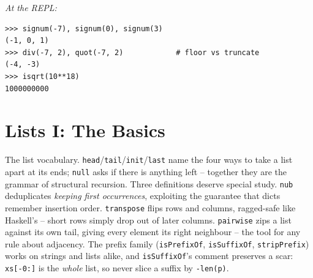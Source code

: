 \documentclass[11pt,letterpaper]{book}
\begin{document}
\noindent\textit{At the REPL:}
\begin{lstlisting}[style=spec]
>>> signum(-7), signum(0), signum(3)
(-1, 0, 1)
>>> div(-7, 2), quot(-7, 2)            # floor vs truncate
(-4, -3)
>>> isqrt(10**18)
1000000000
\end{lstlisting}
\chapter{Lists I: The Basics}

The list vocabulary. \texttt{head}/\texttt{tail}/\texttt{init}/\texttt{last}
name the four ways to take a list apart at its ends; \texttt{null} asks if
there is anything left -- together they are the grammar of structural
recursion. Three definitions deserve special study. \texttt{nub} deduplicates
\emph{keeping first occurrences}, exploiting the guarantee that dicts remember
insertion order. \texttt{transpose} flips rows and columns, ragged-safe like
Haskell's -- short rows simply drop out of later columns. \texttt{pairwise}
zips a list against its own tail, giving every element
its right neighbour -- the tool for any rule about adjacency. The prefix family
(\texttt{isPrefixOf}, \texttt{isSuffixOf}, \texttt{stripPrefix}) works on
strings and lists alike, and \texttt{isSuffixOf}'s comment preserves a scar:
\texttt{xs[-0:]} is the \emph{whole} list, so never slice a suffix by
\texttt{-len(p)}.
\end{document}
